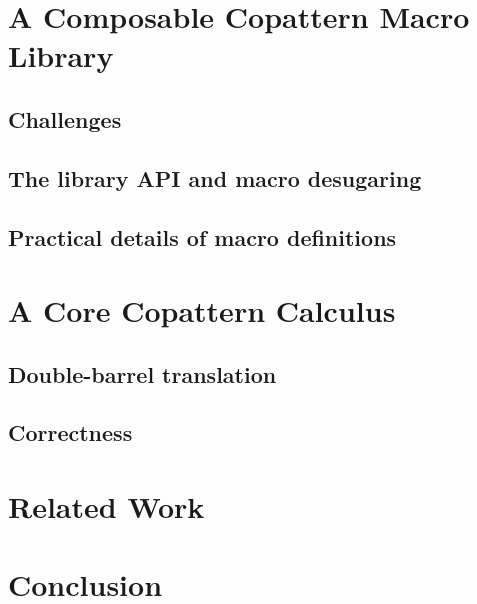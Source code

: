 \documentclass[runningheads]{llncs}
\begin{document}
\section{A Composable Copattern Macro Library}
\label{sec-api}

\subsection{Challenges}


\subsection{The library API and macro desugaring}
\label{sec-desugaring}


\subsection{Practical details of macro definitions}
\label{sec-macro}


\section{A Core Copattern Calculus}
\label{sec-translation}

\subsection{Double-barrel translation}


\subsection{Correctness}
\label{sec-correctness}



% 

\section{Related Work} \label{sec-related-work}



\section{Conclusion} \label{sec-conclusion}
\end{document}
